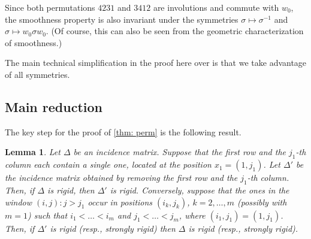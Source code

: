 \documentclass[12pt]{article}
\newtheorem{lemma}[theorem]{Lemma}
\newcommand{\IM}{\Delta}
\begin{document}
Since both permutations $4231$ and $3412$ are involutions and commute with $w_0$, the smoothness property is also invariant under the symmetries
$\sigma\mapsto\sigma^{-1}$ and $\sigma\mapsto w_0\sigma w_0$. (Of course, this can also be seen from the geometric characterization of smoothness.)

The main technical simplification in the proof here over \cite{MR3866895} is that we take advantage of all symmetries.

\subsection{Main reduction}

The key step for the proof of \cref{thm: perm} is the following result.

\begin{lemma} \label{lem: simpind}
Let $\IM$ be an incidence matrix. Suppose that the first row and the $j_1$-th column each contain a single one,
located at the position $x_1=(1,j_1)$.
Let $\IM'$ be the incidence matrix obtained by removing the first row and the $j_1$-th column.
Then, if $\IM$ is rigid, then $\IM'$ is rigid.
Conversely, suppose that the ones in the window $(i,j):j>j_1$ occur in positions $(i_k,j_k)$, $k=2,\dots,m$
(possibly with $m=1$) such that $i_1<\dots<i_m$ and $j_1<\dots<j_m$, where $(i_1,j_1)=(1,j_1)$. Then,
if $\IM'$ is rigid (resp., strongly rigid) then $\IM$ is rigid (resp., strongly rigid).
\end{lemma}
\end{document}
